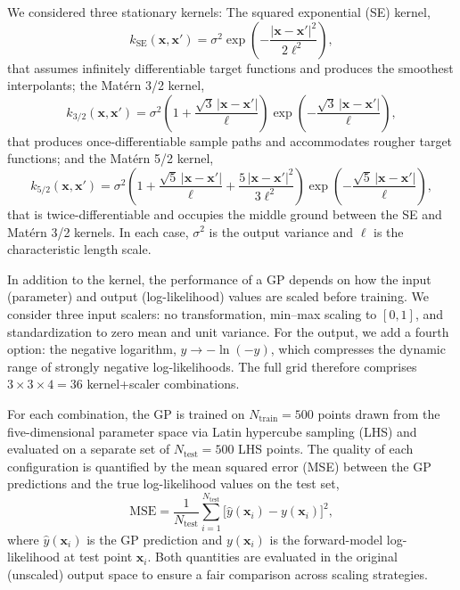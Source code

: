 \documentclass[preprint]{aastex631}
\begin{document}
We considered three stationary kernels: The squared exponential (SE)
kernel,
\begin{equation}
  k_{\mathrm{SE}}(\mathbf{x}, \mathbf{x}') = \sigma^{2}
  \exp\!\left(-\frac{|\mathbf{x} - \mathbf{x}'|^{2}}{2\ell^{2}}\right),
  \label{eq:se_kernel}
\end{equation}
that assumes infinitely differentiable target functions and produces the
smoothest interpolants;  the Mat\'{e}rn 3/2 kernel,
\begin{equation}
  k_{3/2}(\mathbf{x}, \mathbf{x}') = \sigma^{2}
  \left(1 + \frac{\sqrt{3}\,|\mathbf{x} - \mathbf{x}'|}{\ell}\right)
  \exp\!\left(-\frac{\sqrt{3}\,|\mathbf{x} - \mathbf{x}'|}{\ell}\right),
  \label{eq:matern32_kernel}
\end{equation}
that produces once-differentiable sample paths and accommodates rougher
target functions; and the Mat\'{e}rn 5/2 kernel,
\begin{equation}
  k_{5/2}(\mathbf{x}, \mathbf{x}') = \sigma^{2}
  \left(1 + \frac{\sqrt{5}\,|\mathbf{x} - \mathbf{x}'|}{\ell}
  + \frac{5\,|\mathbf{x} - \mathbf{x}'|^{2}}{3\ell^{2}}\right)
  \exp\!\left(-\frac{\sqrt{5}\,|\mathbf{x} - \mathbf{x}'|}{\ell}\right),
  \label{eq:matern52_kernel}
\end{equation}
that is twice-differentiable and occupies the middle ground between the SE
and Mat\'{e}rn 3/2 kernels. In each case, $\sigma^{2}$ is the output
variance and $\ell$ is the characteristic length scale.

In addition to the kernel, the performance of a GP depends on how
the input (parameter) and output (log-likelihood) values are scaled
before training. We consider three input scalers: no transformation,
min--max scaling to $[0,1]$, and standardization to zero mean and unit
variance. For the output, we add a fourth option: the negative
logarithm, $y \to -\!\ln(-y)$, which compresses the dynamic range of
strongly negative log-likelihoods. The full grid therefore comprises
$3 \times 3 \times 4 = 36$ kernel+scaler combinations.

For each combination, the GP is trained on $N_{\mathrm{train}} = 500$
points drawn from the five-dimensional parameter space via Latin
hypercube sampling (LHS) and evaluated on a separate set of
$N_{\mathrm{test}} = 500$ LHS points. The quality of each
configuration is quantified by the mean squared error (MSE) between
the GP predictions and the true log-likelihood values on the test set,
\begin{equation}
  \mathrm{MSE} = \frac{1}{N_{\mathrm{test}}}
  \sum_{i=1}^{N_{\mathrm{test}}}
  \bigl[\hat{y}(\mathbf{x}_{i}) - y(\mathbf{x}_{i})\bigr]^{2},
  \label{eq:mse}
\end{equation}
where $\hat{y}(\mathbf{x}_{i})$ is the GP prediction and
$y(\mathbf{x}_{i})$ is the forward-model log-likelihood at test point
$\mathbf{x}_{i}$. Both quantities are evaluated in the original
(unscaled) output space to ensure a fair comparison across scaling
strategies.
\end{document}
